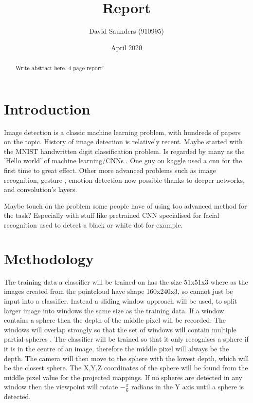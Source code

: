 \documentclass{article}
\title{Report}
\author{David Saunders (910995)}
\date{April 2020}
\begin{document}
\maketitle

\begin{abstract} 
    Write abstract here. 4 page report!
\end{abstract}

\tableofcontents

\section{Introduction}

Image detection is a classic machine learning problem, with hundreds of papers on the topic. 
History of image detection is relatively recent.
Maybe started with the MNIST handwritten digit classification problem.
Is regarded by many as the 'Hello world' of machine learning/CNNs \cite{tensorflow_2020}.
One guy on kaggle used a cnn for the first time to great effect.
Other more advanced problems such as image recognition, gesture
    , emotion detection now possible thanks to deeper networks, and convolution's layers.


Maybe touch on the problem some people have of using too advanced method for the task?
Especially with stuff like pretrained CNN specialised for facial recognition used to detect a black or white dot for example.


\section{Methodology}

The training data a classifier will be trained on has the size 51x51x3 where as the images created from the pointcloud have shape 160x240x3, so cannot just be input into a classifier.
Instead a sliding window approach will be used, to split larger image into windows the same size as the training data.   
If a window contains a sphere then the depth of the middle pixel will be recorded.
The windows will overlap strongly so that the set of windows will contain multiple partial spheres \cite{forsyth2002computer}.
The classifier will be trained so that it only recognises a sphere if it is in the centre of an image, therefore the middle pixel will always be the depth.
The camera will then move to the sphere with the lowest depth, which will be the closest sphere.
The X,Y,Z coordinates of the sphere will be found from the middle pixel value for the projected mappings.
If no spheres are detected in any window then the viewpoint will rotate $-\frac{\pi}{6}$ radians in the Y axis until a sphere is detected.
\end{document}
